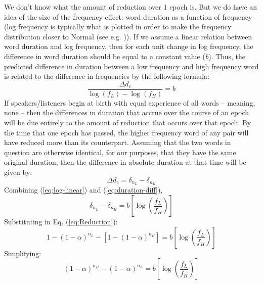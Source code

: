 We don't know what the amount of reduction over 1 epoch is. But we
do have an idea of the size of the frequency effect: word duration
as a function of frequency (log frequency is typically what is plotted
in order to make the frequency distribution closer to Normal (see
e.g. \citet{gahl2012reduce})). If we assume a linear relation between
word duration and log frequency, then for each unit change in log
frequency, the difference in word duration should be equal to a constant
value (\emph{b}). Thus, the predicted difference in duration between
a low frequency and high frequency word is related to the difference
in frequencies by the following formula: 
\begin{equation}
\frac{\Delta d_{e}}{\log(f_{L})-\log(f_{H})}=b\label{eq:log-linear}
\end{equation}
If speakers/listeners begin at birth with equal experience of all words
– meaning, none – then the differences in duration that accrue over
the course of an epoch will be due entirely to the amount of reduction
that occurs over that epoch. By the time that one epoch has passed,
the higher frequency word of any pair will have reduced more than
its counterpart. Assuming that the two words in question are otherwise
identical, for our purposes, that they have the same original duration,
then the difference in absolute duration at that time will be given
by:
\begin{equation}
\Delta d_{e}=\delta_{n_{L}}-\delta_{n_{H}}\label{eq:duration-diff}
\end{equation}
Combining (\ref{eq:log-linear}) and (\ref{eq:duration-diff}),
\begin{equation}
\delta_{n_{L}}-\delta_{n_{H}}=b\left[\log\left(\frac{f_{L}}{f_{H}}\right)\right]
\end{equation}
Substituting in Eq. (\ref{eq:Reduction}):
\begin{equation}
1-(1-\alpha)^{n_{L}}-[1-(1-\alpha)^{n_{H}}]=b\left[\log\left(\frac{f_{L}}{f_{H}}\right)\right]
\end{equation}
Simplifying:
\begin{equation}
(1-\alpha)^{n_{H}}-(1-\alpha)^{n_{L}}=b\left[\log\left(\frac{f_{L}}{f_{H}}\right)\right]\label{eq:reduction-to-freq}
\end{equation}

